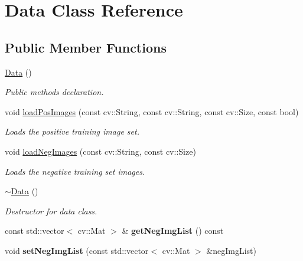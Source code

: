 \hypertarget{classData}{}\section{Data Class Reference}
\label{classData}
\subsection*{Public Member Functions}
\begin{DoxyCompactItemize}
\item 
\hyperlink{classData_af11f741cb7f587e2e495452a8905a22a}{Data} ()\hypertarget{classData_af11f741cb7f587e2e495452a8905a22a}{}\label{classData_af11f741cb7f587e2e495452a8905a22a}

\begin{DoxyCompactList}\small\item\em Public methods declaration. \end{DoxyCompactList}\item 
void \hyperlink{classData_a30cb7a53ab253a2f7e477ac13fe4c3e3}{load\+Pos\+Images} (const cv\+::\+String, const cv\+::\+String, const cv\+::\+Size, const bool)
\begin{DoxyCompactList}\small\item\em Loads the positive training image set. \end{DoxyCompactList}\item 
void \hyperlink{classData_a7a9b971dd776aa4086174ea2704bacd5}{load\+Neg\+Images} (const cv\+::\+String, const cv\+::\+Size)
\begin{DoxyCompactList}\small\item\em Loads the negative training set images. \end{DoxyCompactList}\item 
\hyperlink{classData_aab31956423290f0d62dcca47ab4d16dd}{$\sim$\+Data} ()\hypertarget{classData_aab31956423290f0d62dcca47ab4d16dd}{}\label{classData_aab31956423290f0d62dcca47ab4d16dd}

\begin{DoxyCompactList}\small\item\em Destructor for data class. \end{DoxyCompactList}\item 
const std\+::vector$<$ cv\+::\+Mat $>$ \& {\bfseries get\+Neg\+Img\+List} () const \hypertarget{classData_a7d2fe8b20182b53ad41e12149cc90932}{}\label{classData_a7d2fe8b20182b53ad41e12149cc90932}

\item 
void {\bfseries set\+Neg\+Img\+List} (const std\+::vector$<$ cv\+::\+Mat $>$ \&neg\+Img\+List)\hypertarget{classData_af7e20089fe510f0064a47e89d037f02b}{}\label{classData_af7e20089fe510f0064a47e89d037f02b}


\end{DoxyCompactItemize}
